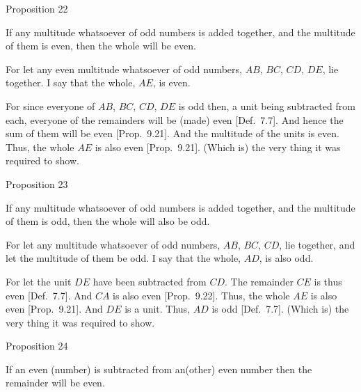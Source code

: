 
\begin{center}
{\large Proposition 22}
\end{center}

If any multitude whatsoever of odd numbers
is added together, and the multitude of them is even,  then the whole will be even.

\epsfysize=0.3in
\centerline{}

For let any even multitude whatsoever of odd numbers, 
$AB$, $BC$, $CD$, $DE$, lie together. I say that the whole, $AE$, is even.

For since everyone of $AB$, $BC$, $CD$, $DE$ is odd then,  a unit being subtracted from
each, everyone of the remainders will be (made) even [Def.~7.7]. And hence the sum of them will be even [Prop.~9.21]. And the multitude  of the units is even.
Thus, the whole $AE$ is also even [Prop.~9.21]. (Which is) the very thing it was required to show.


\begin{center}
{\large Proposition 23}
\end{center}

If  any multitude whatsoever of odd numbers
is added together, and the multitude of them is odd,  then the whole will also be odd.

\epsfysize=0.3in
\centerline{}

For let any  multitude whatsoever of odd numbers, $AB$, $BC$, $CD$,  lie together, and let the multitude of them be odd. I say that the whole, $AD$, is also odd.
 
For let the unit $DE$ have been subtracted from $CD$. The remainder $CE$
is thus even [Def.~7.7]. And $CA$ is also even
[Prop.~9.22]. Thus, the whole $AE$ is also even
[Prop.~9.21]. And $DE$ is a unit. Thus,
$AD$ is odd [Def.~7.7]. (Which is) the very thing it
was required to show.


\begin{center}
{\large Proposition 24}
\end{center}

If  an even (number) is subtracted from an(other) even
number then the remainder will be even.

